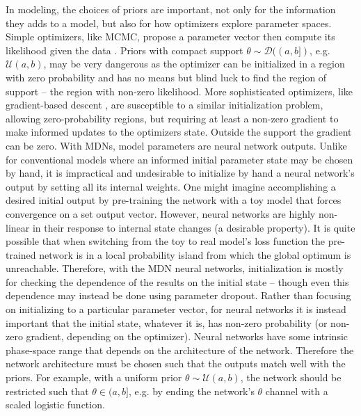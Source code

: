 \documentclass[twocolumn, linenumbers]{aastex631}
\newcommand{\mcal}[1]{\mathcal{#1}}
\begin{document}
    In modeling, the choices of priors are important, not only for the
    information they adds to a model, but also for how optimizers explore
    parameter spaces. Simple optimizers, like MCMC, propose a parameter vector
    then compute its likelihood given the data \citep{HoggForeman-Mackey2018}.
    Priors with compact support  $\theta \sim \mcal{D}((a, b])$, e.g.
    $\mcal{U}(a, b)$, may be very dangerous as the optimizer can be initialized
    in a region with zero probability and has no means but blind luck to find
    the region of support -- the region with non-zero likelihood. More
    sophisticated optimizers, like gradient-based descent \citep{cauchy_2009},
    are susceptible to a similar initialization problem, allowing
    zero-probability regions, but requiring at least a non-zero gradient to make
    informed updates to the optimizers state.  Outside the support the gradient
    can be zero.  With MDNs, model parameters are neural network outputs. Unlike
    for conventional models where an informed initial parameter state may be
    chosen by hand, it is impractical and undesirable to initialize by hand a
    neural network's output by setting all its internal weights. One might
    imagine accomplishing a desired initial output by pre-training the network
    with a toy model that forces convergence on a set output vector.  However,
    neural networks are highly non-linear in their response to internal state
    changes (a desirable property). It is quite possible that when switching
    from the toy to real model's loss function the pre-trained network is in a
    local probability island from which the global optimum is unreachable.  
    Therefore, with the MDN neural networks, initialization is mostly
    for checking the dependence of the results on the initial state --
    though even this dependence may instead be done using parameter
    dropout. Rather than focusing on initializing to a particular
    parameter vector, for neural networks it is instead important that
    the initial state, whatever it is, has non-zero probability (or
    non-zero gradient, depending on the optimizer).  Neural networks
    have some intrinsic phase-space range that depends on the
    architecture of the network. Therefore the network architecture must
    be chosen such that the outputs match well with the priors. For
    example, with a uniform prior $\theta \sim \mcal{U}(a,b)$, the
    network should be restricted such that $\theta \in (a, b]$, e.g. by
    ending the network's $\theta$ channel with a scaled logistic
    function.
\end{document}
